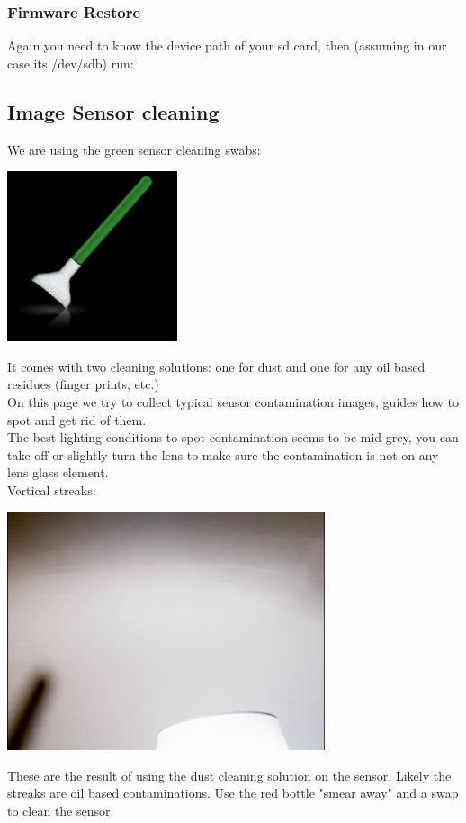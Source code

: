 \subsubsection{Firmware Restore}

Again you need to know the device path of your sd card, then (assuming in our case its /dev/sdb) run:







\subsection{Image Sensor cleaning}

We are using the green sensor cleaning swabs:

\begin{center}
\includegraphics[height=5cm]{images/Green_Swabs_200X200_B}
\end{center}

It comes with two cleaning solutions: one for dust and one for any oil based residues (finger prints, etc.)\\

On this page we try to collect typical sensor contamination images, guides how to spot and get rid of them.\\

The best lighting conditions to spot contamination seems to be mid grey, you can take off or slightly turn the lens to make sure the contamination is not on any lens glass element.\\

Vertical streaks:\\

\begin{center}
\includegraphics[height=7cm]{images/Vertical-streaks}
\end{center}

These are the result of using the dust cleaning solution on the sensor. Likely the streaks are oil based contaminations. Use the red bottle "smear away" and a swap to clean the sensor. 